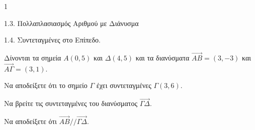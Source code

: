 \begin{ylh}{1}
    \item 1.3. Πολλαπλασιασμός Αριθμού με Διάνυσμα
    \item 1.4. Συντεταγμένες στο Επίπεδο.
\end{ylh}
Δίνονται τα σημεία $A(0,5)$ και $\Delta(4,5)$ και τα διανύσματα $\vec{AB} = (3,-3)$ και $\vec{A\Gamma} = (3,1)$.
\begin{alist}
    \item Να αποδείξετε ότι το σημείο $\Gamma$ έχει συντεταγμένες $\Gamma(3,6)$. 
    \item
    \begin{rlist}
        \item Να βρείτε τις συντεταγμένες του διανύσματος $\vec{\Gamma\Delta}$. 
        \item Να αποδείξετε ότι $\vec{AB} // \vec{\Gamma\Delta}$. 
    \end{rlist}
\end{alist}
